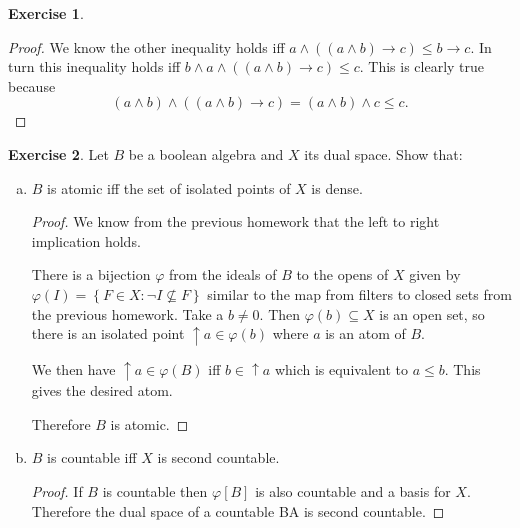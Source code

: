 \documentclass{article}
\newcommand{\set}[1]{\left\{#1\right\}}
\newcommand{\setwith}[2]{\set{#1:#2}}
\theoremstyle{definition}
\newtheorem{question}{Exercise}
\begin{document}
\begin{question}
\begin{enumerate}[(a)]
\begin{proof}
                  We know the other inequality holds iff \(a\wedge((a\wedge
                  b)\to c)\leq b\to c\). In turn this inequality holds iff
                  \(b\wedge a\wedge((a\wedge b)\to c)\leq c\). This is clearly
                  true because
                  \[
                      (a\wedge b)\wedge((a\wedge b)\to c)=(a\wedge b)\wedge c\leq c.
                  \]
              \end{proof}
    \end{enumerate}
\end{question}

\begin{question}
    Let \(B\) be a boolean algebra and \(X\) its dual space. Show that:
    \begin{enumerate}[a)]
        \item \(B\) is atomic iff the set of isolated points of \(X\) is dense.

              \begin{proof}
                  We know from the previous homework that the left to right
                  implication holds.

                  There is a bijection \(\varphi\) from the ideals of \(B\) to
                  the opens of \(X\) given by \(\varphi(I)=\setwith{F\in X}{\neg
                      I\not\subseteq F}\) similar to the map from filters to closed
                  sets from the previous homework. Take a \(b\neq 0\). Then
                  \(\varphi(b)\subseteq X\) is an open set, so there is an
                  isolated point \(\uparrow a\in\varphi(b)\) where \(a\) is an
                  atom of \(B\).

                  We then have \(\uparrow a\in\varphi(B)\) iff \(b\in\uparrow
                  a\) which is equivalent to \(a\leq b\). This gives the desired
                  atom.

                  Therefore \(B\) is atomic.
              \end{proof}

        \item \(B\) is countable iff \(X\) is second countable.

              \begin{proof}
                  If \(B\) is countable then \(\varphi[B]\) is also countable
                  and a basis for \(X\). Therefore the dual space of a countable
                  BA is second countable.


\end{proof}
\end{enumerate}
\end{question}
\end{document}

